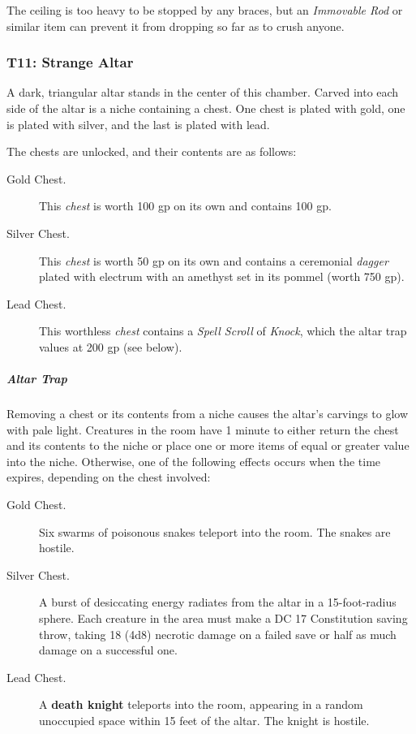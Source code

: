 \documentclass[10pt,a4paper,twoside,bg=print,twocolumn,openany,nodeprecatedcode]{dndbook}
\begin{document}
The ceiling is too heavy to be stopped by any braces, but an \textit{Immovable Rod} or similar item can prevent it from dropping so far as to crush anyone.

\subsubsection{T11: Strange Altar}
\begin{DndReadAloud}{}
A dark, triangular altar stands in the center of this chamber. Carved into each side of the altar is a niche containing a chest. One chest is plated with gold, one is plated with silver, and the last is plated with lead.

\end{DndReadAloud}

The chests are unlocked, and their contents are as follows:


\begin{description}
\item[Gold Chest.]
This \textit{chest} is worth 100 gp on its own and contains 100 gp.
\item[Silver Chest.]
This \textit{chest} is worth 50 gp on its own and contains a ceremonial \textit{dagger} plated with electrum with an amethyst set in its pommel (worth 750 gp).
\item[Lead Chest.]
This worthless \textit{chest} contains a \textit{Spell Scroll} of \textit{Knock}, which the altar trap values at 200 gp (see below).
\end{description}

\subparagraph{Altar Trap}
Removing a chest or its contents from a niche causes the altar's carvings to glow with pale light. Creatures in the room have 1 minute to either return the chest and its contents to the niche or place one or more items of equal or greater value into the niche. Otherwise, one of the following effects occurs when the time expires, depending on the chest involved:


\begin{description}
\item[Gold Chest.]
Six swarms of poisonous snakes teleport into the room. The snakes are hostile.
\item[Silver Chest.]
A burst of desiccating energy radiates from the altar in a 15-foot-radius sphere. Each creature in the area must make a DC 17 Constitution saving throw, taking 18 (4d8) necrotic damage on a failed save or half as much damage on a successful one.
\item[Lead Chest.]
A \textbf{death knight} teleports into the room, appearing in a random unoccupied space within 15 feet of the altar. The knight is hostile.
\end{description}
\end{document}
